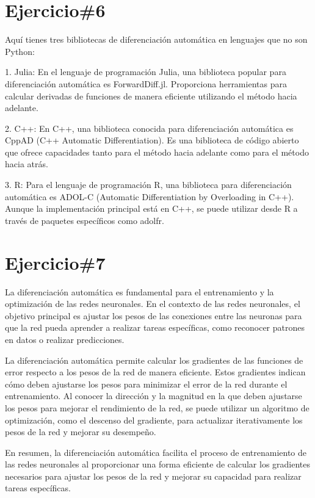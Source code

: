\documentclass[a4paper,12pt]{article}
\begin{document}
\section*{Ejercicio\#6}

Aquí tienes tres bibliotecas de diferenciación automática en lenguajes que no son Python:

1. Julia: En el lenguaje de programación Julia, una biblioteca popular para diferenciación automática es ForwardDiff.jl. Proporciona herramientas para calcular derivadas de funciones de manera eficiente utilizando el método hacia adelante.

2. C++: En C++, una biblioteca conocida para diferenciación automática es CppAD (C++ Automatic Differentiation). Es una biblioteca de código abierto que ofrece capacidades tanto para el método hacia adelante como para el método hacia atrás.

3. R: Para el lenguaje de programación R, una biblioteca para diferenciación automática es ADOL-C (Automatic Differentiation by Overloading in C++). Aunque la implementación principal está en C++, se puede utilizar desde R a través de paquetes específicos como adolfr.

\section*{Ejercicio\#7}

La diferenciación automática es fundamental para el entrenamiento y la optimización de las redes neuronales. 
En el contexto de las redes neuronales, el objetivo principal es ajustar los pesos de las conexiones entre las 
neuronas para que la red pueda aprender a realizar tareas específicas, como reconocer patrones en datos o realizar predicciones.

La diferenciación automática permite calcular los gradientes de las funciones de error respecto a los pesos de la red de 
manera eficiente. Estos gradientes indican cómo deben ajustarse los pesos para minimizar el error de la red durante el 
entrenamiento. Al conocer la dirección y la magnitud en la que deben ajustarse los pesos para mejorar el rendimiento de 
la red, se puede utilizar un algoritmo de optimización, como el descenso del gradiente, para actualizar iterativamente los 
pesos de la red y mejorar su desempeño.

En resumen, la diferenciación automática facilita el proceso de entrenamiento de las redes neuronales al proporcionar una 
forma eficiente de calcular los gradientes necesarios para ajustar los pesos de la red y mejorar su capacidad para realizar tareas específicas.


\end{document}
